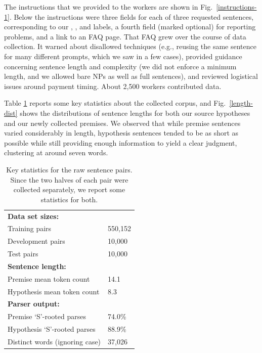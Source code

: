 The instructions that we provided to the workers are shown in Fig.~\ref{instructions-1}. Below the instructions were three fields for each of three requested sentences, corresponding to our , , and  labels, a fourth field (marked optional) for reporting problems, and a link to an FAQ page. That FAQ grew over the course of data collection. It warned about disallowed techniques (e.g., reusing the same sentence for many different prompts, which we saw in a few cases), provided guidance concerning sentence length and complexity (we did not enforce a minimum length, and we allowed bare NPs as well as full sentences), and reviewed logistical issues around payment timing. About 2,500 workers contributed data.

Table \ref{collection-stats} reports some key statistics about the collected corpus, and Fig.~\ref{length-dist} shows the distributions of sentence lengths for both our source hypotheses and our newly collected premises. We observed that while premise sentences varied considerably in length, hypothesis sentences tended to be as short as possible while still providing enough information to yield a clear judgment, clustering at around seven words.

\begin{table}
\center
  \begin{tabular}{l l} 
    \toprule
\multicolumn{2}{l}{\textbf{Data set sizes:}}\\
Training pairs &  550,152\\
Development pairs &  10,000\\
Test pairs & 10,000\\
\midrule
\multicolumn{2}{l}{\textbf{Sentence length:}}\\
Premise mean token count & 14.1\\
Hypothesis mean token count & 8.3 \\
\midrule
\multicolumn{2}{l}{\textbf{Parser output:}}\\
Premise `S'-rooted parses & 74.0\%\\
Hypothesis `S'-rooted parses & 88.9\%\\
Distinct words (ignoring case) & 37,026\\
    \bottomrule
  \end{tabular}
\caption{\label{collection-stats}Key statistics for the raw sentence pairs. Since the two halves of each pair were collected separately, we report some statistics for both.} 
\end{table}


